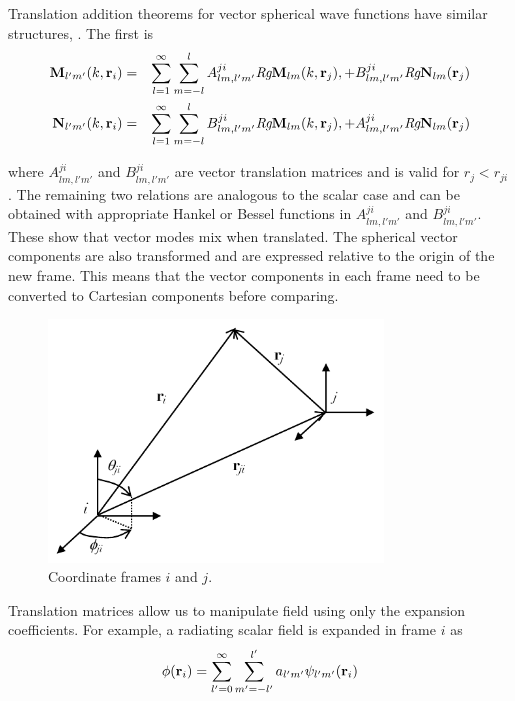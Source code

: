 Translation addition theorems for vector spherical wave functions have similar structures, \cite{chew1995waves}. The first is 
\begin{eqnarray}
\mathbf{M}_{l'm'}(k,\mathbf{r}_i) &=& \sum_{l=1}^{\infty}\sum_{m=-l}^{l} A^{ji}_{lm,l'm'} \textit{Rg}\mathbf{M}_{lm}(k,\mathbf{r}_j),  + B^{ji}_{lm,l'm'} \textit{Rg}\mathbf{N}_{lm}(\mathbf{r}_j) \\
\mathbf{N}_{l'm'}(k,\mathbf{r}_i) &=& \sum_{l=1}^{\infty}\sum_{m=-l}^{l} B^{ji}_{lm,l'm'} \textit{Rg}\mathbf{M}_{lm}(k,\mathbf{r}_j),  + A^{ji}_{lm,l'm'} \textit{Rg}\mathbf{N}_{lm}(\mathbf{r}_j)
\end{eqnarray}

\noindent where $A^{ji}_{lm,l'm'}$ and $B^{ji}_{lm,l'm'}$ are vector translation matrices and is valid for $r_j < r_{ji}$. The remaining two relations are analogous to the scalar case and can be obtained with appropriate Hankel or Bessel functions in $A^{ji}_{lm,l'm'}$ and $B^{ji}_{lm,l'm'}$. These show that vector modes mix when translated. The spherical vector components are also transformed and are expressed relative to the origin of the new frame. This means that the vector components in each frame need to be converted to Cartesian components before comparing.


\begin{figure}[H] 
   \centering
   \includegraphics[width=3.5in]{Translation/Figures/transdiagram} 
   \caption{Coordinate frames $i$ and $j$.}
   \label{translationadd}
\end{figure}


Translation matrices allow us to manipulate field using only the expansion coefficients.  For example, a radiating scalar field is expanded in frame $i$ as 
\begin{equation}
\phi(\mathbf{r}_i) = \sum_{l'=0}^{\infty}\sum_{m'=-l'}^{l'} a_{l'm'} \psi_{l'm'}(\mathbf{r}_i)
\end{equation}

